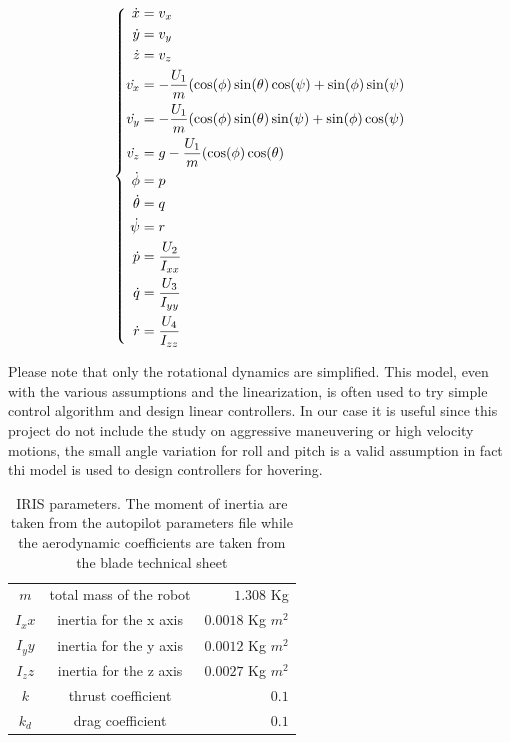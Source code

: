 \vspace{2ex}
\begin{equation}
\vspace{2ex}
\left\lbrace
	\begin{aligned}
		\dot{x}& = v_x \\
		\dot{y}& = v_y \\
		\dot{z}& = v_z \\
		\dot{v_x}& = -\frac{U_1}{m}(\cos(\phi)\sin(\theta)\cos(\psi) + \sin(\phi)\sin(\psi) \\
		\dot{v_y}& = -\frac{U_1}{m}(\cos(\phi)\sin(\theta)\sin(\psi) + \sin(\phi)\cos(\psi) \\
		\dot{v_z}& = g - \frac{U_1}{m}(\cos(\phi)\cos(\theta) \\
        \dot{\phi}& = p \\
        \dot{\theta}& = q  \\
        \dot{\psi}& = r \\
        \dot{p}& =\frac{U_2}{I_{xx}} \\
        \dot{q}& =\frac{U_3}{I_{yy}} \\
        \dot{r}& =\frac{U_4}{I_{zz}} \\
     \end{aligned}
     \right.
\label{eq:mathlinlmodel}
\end{equation}

\noindent
Please note that only the rotational dynamics are simplified. This model, even with the various assumptions and the linearization, is often used to try simple control algorithm and design linear controllers. In our case it is useful since this project do not include the study on aggressive maneuvering or high velocity motions, the small angle variation for roll and pitch is a valid assumption in fact thi model is used to design controllers for hovering. 

\begin{table}[h]
\centering
\begin{tabular}{c c r}
\hline
$m$ & total mass of the robot & $1.308$ Kg \\
$I_xx$& inertia for the x axis& $0.0018$ Kg $m^2$ \\
$I_yy$& inertia for the y axis& $0.0012$ Kg $m^2$ \\
$I_zz$& inertia for the z axis& $0.0027$ Kg $m^2$ \\ \hline
$k$   & thrust coefficient & $0.1$ \\
$k_d$ & drag coefficient & $ 0.1$ \\
\end{tabular}
\caption{IRIS parameters. The moment of inertia are taken from the autopilot parameters file while the aerodynamic coefficients are taken from the blade technical sheet}
\end{table}















